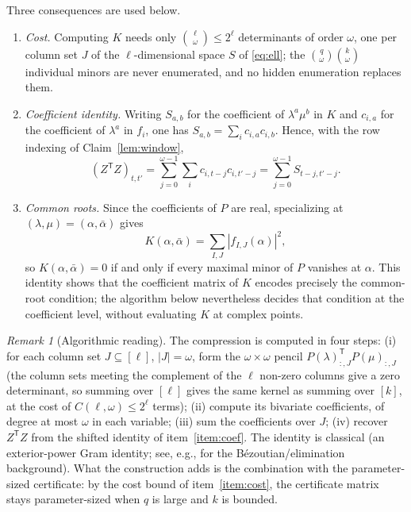 \documentclass[journal]{IEEEtran}
\theoremstyle{plainn}
\theoremstyle{remark}
\newtheorem{remark}{Remark}
\begin{document}
Three consequences are used below.
\begin{enumerate}[label=(\roman*)]
\item\label{item:cost} \emph{Cost.} Computing $K$ needs only
$\binom{\ell}{\omega}\le2^{\ell}$ determinants of order $\omega$, one per
column set $J$ of the $\ell$-dimensional space $S$ of \eqref{eq:ell}; the
$\binom q\omega\binom k\omega$ individual minors are never enumerated,
and no hidden enumeration replaces them.
\item\label{item:coef} \emph{Coefficient identity.} Writing $S_{a,b}$
for the coefficient of $\lambda^a\mu^b$ in $K$ and $c_{i,a}$ for the
coefficient of $\lambda^a$ in $f_i$, one has
$S_{a,b}=\sum_i c_{i,a}c_{i,b}$. Hence, with the row indexing of
Claim~\ref{lem:window},
\begin{equation*}
(Z^{\mathsf T}Z)_{t,t'}
=\sum_{j=0}^{\omega-1}\sum_i c_{i,t-j}c_{i,t'-j}
=\sum_{j=0}^{\omega-1}S_{t-j,t'-j}.
\end{equation*}
\item\label{item:roots} \emph{Common roots.} Since the coefficients of
$P$ are real, specializing at $(\lambda,\mu)=(\alpha,\bar\alpha)$ gives
\begin{equation*}
K(\alpha,\bar\alpha)
=\sum_{I,J}\left|f_{I,J}(\alpha)\right|^2,
\end{equation*}
so $K(\alpha,\bar\alpha)=0$ if and only if every maximal minor of $P$
vanishes at $\alpha$. This identity shows that the coefficient matrix of
$K$ encodes precisely the common-root condition; the algorithm below
nevertheless decides that condition at the coefficient level, without
evaluating $K$ at complex points.
\end{enumerate}

\begin{remark}[Algorithmic reading]\label{rem:algo}
The compression is computed in four steps:
(i) for each column set $J\subseteq[\ell]$, $|J|=\omega$, form the
$\omega\times\omega$ pencil $P(\lambda)_{:,J}^{\mathsf T}P(\mu)_{:,J}$
(the column sets meeting the complement of the $\ell$ non-zero columns give a zero
determinant, so summing over $[\ell]$ gives the same kernel as summing over $[k]$,
at the cost of $C(\ell,\omega)\le 2^\ell$ terms);
(ii) compute its bivariate coefficients, of degree at most $\omega$ in
each variable;
(iii) sum the coefficients over $J$;
(iv) recover $Z^{\mathsf T}Z$ from the shifted identity of
item~\ref{item:coef}.
The identity is classical (an exterior-power Gram identity; see, e.g.,
\cite{emi99} for the B\'ezoutian/elimination background). What the
construction adds is the combination with the parameter-sized
certificate: by the cost bound of item~\ref{item:cost}, the certificate
matrix stays parameter-sized when $q$ is large and $k$ is bounded.
\end{remark}
\end{document}
